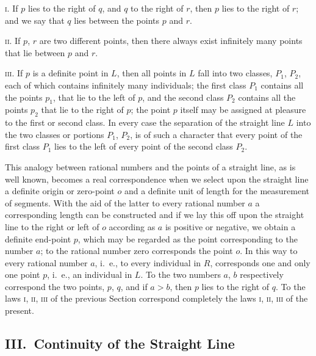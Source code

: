 \documentclass[polutonikogreek,english,twoside,openright]{article}
\begin{document}
\textsc{i.} If $p$ lies to the right of $q$, and $q$ to the right of
$r$, then $p$ lies to the right of $r$; and we say that $q$ lies
between the points $p$ and $r$.

\textsc{ii.} If $p$, $r$ are two different points, then there always
exist infinitely many points that lie between $p$ and $r$.

\textsc{iii.} If $p$ is a definite point in $L$, then all points in
$L$ fall into two classes, $P_1$, $P_2$, each of which contains
infinitely many individuals; the first class $P_1$ contains all the
points $p_1$, that lie to the left of $p$, and the second class $P_2$
contains all the points $p_2$ that lie to the right of $p$; the point
$p$ itself may be assigned at pleasure to the first or second
class. In every case the separation of the straight line $L$ into the
two classes or portions $P_1$, $P_2$, is of such a character that
every point of the first class $P_1$ lies to the left of every point
of the second class $P_2$.

This analogy between rational numbers and the points of a straight
line, as is well known, becomes a real correspondence when we select
upon the straight line a definite origin or zero-point $o$ and a
definite unit of length for the measurement of segments. With the aid
of the latter to every rational number $a$ a corresponding length can
be constructed and if we lay this off upon the straight line to the
right or left of $o$ according as $a$ is positive or negative, we
obtain a definite end-point $p$, which may be regarded as the point
corresponding to the number $a$; to the rational number zero
corresponds the point $o$. In this way to every rational number $a$,
i.~e., to every individual in $R$, corresponds one and only one point
$p$, i.~e., an individual in $L$. To the two numbers $a$, $b$
respectively correspond the two points, $p$, $q$, and if $a>b$, then
$p$ lies to the right of $q$. To the laws \textsc{i}, \textsc{ii},
\textsc{iii} of the previous Section correspond completely the laws
\textsc{i}, \textsc{ii}, \textsc{iii} of the present.

\subsection*{III.\ Continuity of the Straight Line}
\label{EISIII}
\end{document}
